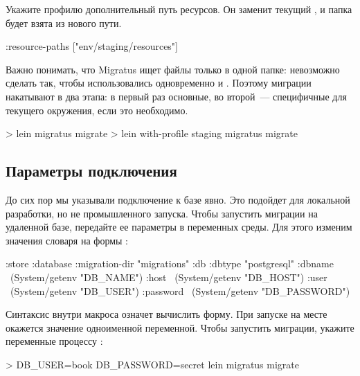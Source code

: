 Укажите профилю  дополнительный путь ресурсов. Он заменит текущий , и папка  будет взята из нового пути.

\begin{english}
  \begin{clojure}
{:resource-paths ["env/staging/resources"]}
  \end{clojure}
\end{english}

Важно понимать, что Migratus ищет файлы только в одной папке: невозможно сделать так, чтобы использовались одновременно  и . Поэтому миграции накатывают в два этапа: в первый раз основные, во второй~--- специфичные для текущего окружения, если это необходимо.

\begin{english}
  \begin{bash}
> lein migratus migrate
> lein with-profile staging migratus migrate
  \end{bash}
\end{english}

\subsection{Параметры подключения}

До сих пор мы указывали подключение к базе явно. Это подойдет для локальной разработки, но не промышленного запуска. Чтобы запустить миграции на удаленной базе, передайте ее параметры в переменных среды. Для этого изменим значения словаря  на формы :

\begin{english}
  \begin{clojure}
{:store :database
 :migration-dir "migrations"
 :db {:dbtype "postgresql"
      :dbname ~(System/getenv "DB_NAME")
      :host ~(System/getenv "DB_HOST")
      :user ~(System/getenv "DB_USER")
      :password ~(System/getenv "DB_PASSWORD")}}
  \end{clojure}
\end{english}

Синтаксис  внутри макроса  означет вычислить форму. При запуске  на месте  окажется значение одноименной переменной. Чтобы запустить миграции, укажите переменные процессу :

\begin{english}
  \begin{bash}
> DB_USER=book DB_PASSWORD=secret lein migratus migrate
  \end{bash}
\end{english}

